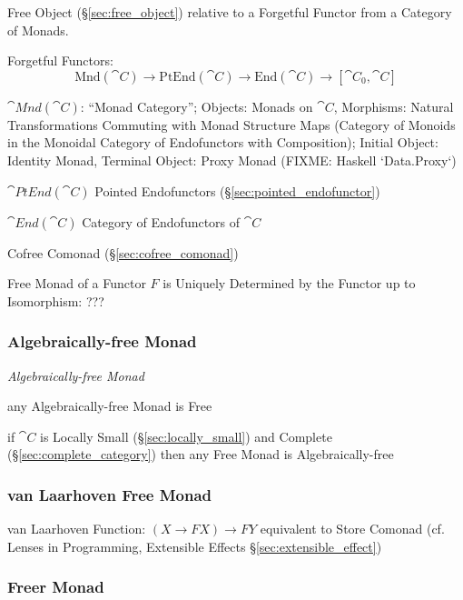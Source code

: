 Free Object (\S\ref{sec:free_object}) relative to a Forgetful Functor
from a Category of Monads.

Forgetful Functors:
\[
  \mathrm{Mnd}(\cat{C}) \rightarrow \mathrm{PtEnd}(\cat{C})
  \rightarrow \mathrm{End}(\cat{C}) \rightarrow [\cat{C}_0, \cat{C}]
\]

$\cat{Mnd}(\cat{C})$: ``Monad Category''; Objects: Monads on
$\cat{C}$, Morphisms: Natural Transformations Commuting with Monad
Structure Maps (Category of Monoids in the Monoidal Category of
Endofunctors with Composition); Initial Object: Identity Monad,
Terminal Object: Proxy Monad (FIXME: Haskell `Data.Proxy`)

$\cat{PtEnd}(\cat{C})$ Pointed Endofunctors
(\S\ref{sec:pointed_endofunctor})

$\cat{End}(\cat{C})$ Category of Endofunctors of $\cat{C}$

Cofree Comonad (\S\ref{sec:cofree_comonad})

Free Monad of a Functor $F$ is Uniquely Determined by the Functor up
to Isomorphism: ??? %



\subsubsection{Algebraically-free Monad}\label{sec:algebraically_free}

\emph{Algebraically-free Monad}

any Algebraically-free Monad is Free

if $\cat{C}$ is Locally Small (\S\ref{sec:locally_small}) and Complete
(\S\ref{sec:complete_category}) then any Free Monad is
Algebraically-free



\subsubsection{van Laarhoven Free Monad}
\label{sec:vanlaarhoven_free_monad}

van Laarhoven Function: $(X \rightarrow F X) \rightarrow F Y$
equivalent to Store Comonad (cf. Lenses in Programming, Extensible
Effects \S\ref{sec:extensible_effect})



\subsubsection{Freer Monad}\label{sec:freer_monad}

